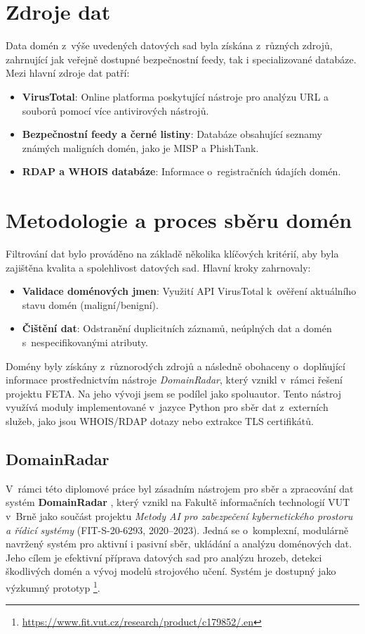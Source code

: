 \section{Zdroje dat}
Data domén z~výše uvedených datových sad byla získána z~různých zdrojů, zahrnující jak veřejně dostupné bezpečnostní feedy, tak i specializované databáze. Mezi hlavní zdroje dat patří: \cite{petr}
\begin{itemize}
    \item \textbf{VirusTotal}: Online platforma poskytující nástroje pro analýzu URL a souborů pomocí více antivirových nástrojů.
    \item \textbf{Bezpečnostní feedy a černé listiny}: Databáze obsahující seznamy známých maligních domén, jako je MISP a PhishTank.
    \item \textbf{RDAP a WHOIS databáze}: Informace o~registračních údajích domén. 
\end{itemize}



\section{Metodologie a proces sběru domén}
Filtrování dat bylo prováděno na základě několika klíčových kritérií, aby byla zajištěna kvalita a spolehlivost datových sad. Hlavní kroky zahrnovaly: \cite{petr}
\begin{itemize}
    \item \textbf{Validace doménových jmen}: Využití API VirusTotal k~ověření aktuálního stavu domén (maligní/benigní).
    \item \textbf{Čištění dat}: Odstranění duplicitních záznamů, neúplných dat a domén s~nespecifikovanými atributy.

\end{itemize}

\noindent Domény byly získány z~různorodých zdrojů a následně obohaceny o~doplňující informace prostřednictvím nástroje \textit{DomainRadar}, který vznikl v~rámci řešení projektu FETA. Na jeho vývoji jsem se podílel jako spoluautor. Tento nástroj využívá moduly implementované v~jazyce Python pro sběr dat z~externích služeb, jako jsou WHOIS/RDAP dotazy nebo extrakce TLS certifikátů.


\subsection{DomainRadar}
\label{domainradar}

V~rámci této diplomové práce byl zásadním nástrojem pro sběr a zpracování dat systém \textbf{DomainRadar} \cite{domainradar}, který vznikl na Fakultě informačních technologií VUT v~Brně jako součást projektu \textit{Metody AI pro zabezpečení kybernetického prostoru a řídicí systémy} (FIT-S-20-6293, 2020–2023). Jedná se o~komplexní, modulárně navržený systém pro aktivní i pasivní sběr, ukládání a analýzu doménových dat. Jeho cílem je efektivní příprava datových sad pro analýzu hrozeb, detekci škodlivých domén a vývoj modelů strojového učení. Systém je dostupný jako výzkumný prototyp \footnote{\url{https://www.fit.vut.cz/research/product/c179852/.en}}.

